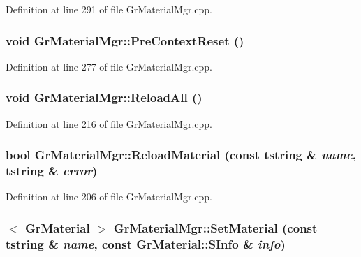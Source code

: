 Definition at line 291 of file GrMaterialMgr.cpp.\hypertarget{class_gr_material_mgr_e3b56eb5530047e084fb96c595da517b}{
\subsubsection[{PreContextReset}]{\setlength{\rightskip}{0pt plus 5cm}void GrMaterialMgr::PreContextReset ()}}
\label{class_gr_material_mgr_e3b56eb5530047e084fb96c595da517b}




Definition at line 277 of file GrMaterialMgr.cpp.\hypertarget{class_gr_material_mgr_c0272e7cbc2981ad1996ac569346054f}{
\subsubsection[{ReloadAll}]{\setlength{\rightskip}{0pt plus 5cm}void GrMaterialMgr::ReloadAll ()}}
\label{class_gr_material_mgr_c0272e7cbc2981ad1996ac569346054f}




Definition at line 216 of file GrMaterialMgr.cpp.\hypertarget{class_gr_material_mgr_fd19248af5f08710d9607b9db84c52b5}{
\subsubsection[{ReloadMaterial}]{\setlength{\rightskip}{0pt plus 5cm}bool GrMaterialMgr::ReloadMaterial (const {\bf tstring} \& {\em name}, \/  {\bf tstring} \& {\em error})}}
\label{class_gr_material_mgr_fd19248af5f08710d9607b9db84c52b5}




Definition at line 206 of file GrMaterialMgr.cpp.\hypertarget{class_gr_material_mgr_7134ce45c3dc3b873ea2c5deb896ba08}{
\subsubsection[{SetMaterial}]{$<$ {\bf GrMaterial} $>$ GrMaterialMgr::SetMaterial (const {\bf tstring} \& {\em name}, \/  const {\bf GrMaterial::SInfo} \& {\em info})}}
\label{class_gr_material_mgr_7134ce45c3dc3b873ea2c5deb896ba08}




